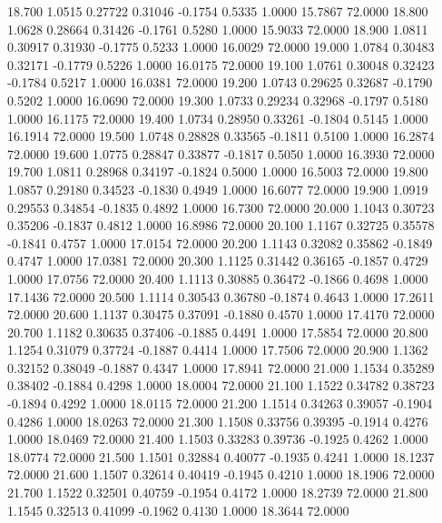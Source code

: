   18.700   1.0515   0.27722   0.31046  -0.1754   0.5335   1.0000  15.7867  72.0000
  18.800   1.0628   0.28664   0.31426  -0.1761   0.5280   1.0000  15.9033  72.0000
  18.900   1.0811   0.30917   0.31930  -0.1775   0.5233   1.0000  16.0029  72.0000
  19.000   1.0784   0.30483   0.32171  -0.1779   0.5226   1.0000  16.0175  72.0000
  19.100   1.0761   0.30048   0.32423  -0.1784   0.5217   1.0000  16.0381  72.0000
  19.200   1.0743   0.29625   0.32687  -0.1790   0.5202   1.0000  16.0690  72.0000
  19.300   1.0733   0.29234   0.32968  -0.1797   0.5180   1.0000  16.1175  72.0000
  19.400   1.0734   0.28950   0.33261  -0.1804   0.5145   1.0000  16.1914  72.0000
  19.500   1.0748   0.28828   0.33565  -0.1811   0.5100   1.0000  16.2874  72.0000
  19.600   1.0775   0.28847   0.33877  -0.1817   0.5050   1.0000  16.3930  72.0000
  19.700   1.0811   0.28968   0.34197  -0.1824   0.5000   1.0000  16.5003  72.0000
  19.800   1.0857   0.29180   0.34523  -0.1830   0.4949   1.0000  16.6077  72.0000
  19.900   1.0919   0.29553   0.34854  -0.1835   0.4892   1.0000  16.7300  72.0000
  20.000   1.1043   0.30723   0.35206  -0.1837   0.4812   1.0000  16.8986  72.0000
  20.100   1.1167   0.32725   0.35578  -0.1841   0.4757   1.0000  17.0154  72.0000
  20.200   1.1143   0.32082   0.35862  -0.1849   0.4747   1.0000  17.0381  72.0000
  20.300   1.1125   0.31442   0.36165  -0.1857   0.4729   1.0000  17.0756  72.0000
  20.400   1.1113   0.30885   0.36472  -0.1866   0.4698   1.0000  17.1436  72.0000
  20.500   1.1114   0.30543   0.36780  -0.1874   0.4643   1.0000  17.2611  72.0000
  20.600   1.1137   0.30475   0.37091  -0.1880   0.4570   1.0000  17.4170  72.0000
  20.700   1.1182   0.30635   0.37406  -0.1885   0.4491   1.0000  17.5854  72.0000
  20.800   1.1254   0.31079   0.37724  -0.1887   0.4414   1.0000  17.7506  72.0000
  20.900   1.1362   0.32152   0.38049  -0.1887   0.4347   1.0000  17.8941  72.0000
  21.000   1.1534   0.35289   0.38402  -0.1884   0.4298   1.0000  18.0004  72.0000
  21.100   1.1522   0.34782   0.38723  -0.1894   0.4292   1.0000  18.0115  72.0000
  21.200   1.1514   0.34263   0.39057  -0.1904   0.4286   1.0000  18.0263  72.0000
  21.300   1.1508   0.33756   0.39395  -0.1914   0.4276   1.0000  18.0469  72.0000
  21.400   1.1503   0.33283   0.39736  -0.1925   0.4262   1.0000  18.0774  72.0000
  21.500   1.1501   0.32884   0.40077  -0.1935   0.4241   1.0000  18.1237  72.0000
  21.600   1.1507   0.32614   0.40419  -0.1945   0.4210   1.0000  18.1906  72.0000
  21.700   1.1522   0.32501   0.40759  -0.1954   0.4172   1.0000  18.2739  72.0000
  21.800   1.1545   0.32513   0.41099  -0.1962   0.4130   1.0000  18.3644  72.0000
